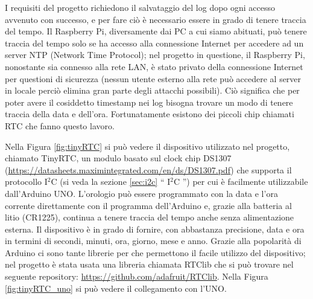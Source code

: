 \documentclass[12pt]{report}
\begin{document}
I requisiti del progetto richiedono il salvataggio del log dopo ogni accesso avvenuto con successo, e per fare ciò è necessario essere in grado di tenere traccia del tempo. Il Raspberry Pi, diversamente dai PC a cui siamo abituati, può tenere traccia del tempo solo se ha accesso alla connessione Internet per accedere ad un server NTP (Network Time Protocol); nel progetto in questione, il Raspberry Pi, nonostante sia connesso alla rete LAN, è stato privato della connessione Internet per questioni di sicurezza (nessun utente esterno alla rete può accedere al server in locale perciò elimina gran parte degli attacchi possibili). Ciò significa che per poter avere il cosiddetto timestamp nei log bisogna trovare un modo di tenere traccia della data e dell'ora. Fortunatamente esistono dei piccoli chip chiamati RTC che fanno questo lavoro. 

Nella Figura \ref{fig:tinyRTC} si può vedere il dispositivo utilizzato nel progetto, chiamato TinyRTC, un modulo basato sul clock chip DS1307 (\url{https://datasheets.maximintegrated.com/en/ds/DS1307.pdf}) che supporta il protocollo I$^2$C (si veda la sezione \ref{sec:i2c} \textquotedblleft{} I$^2$C \textquotedblright{}) per cui è facilmente utilizzabile dall'Arduino UNO.
L'orologio può essere programmato con la data e l'ora corrente direttamente con il programma dell'Arduino e, grazie alla batteria al litio (CR1225), continua a tenere traccia del tempo anche senza alimentazione esterna. Il dispositivo è in grado di fornire, con abbastanza precisione, data e ora in termini di secondi, minuti, ora, giorno, mese e anno. Grazie alla popolarità di Arduino ci sono tante librerie per che permettono il facile utilizzo del dispositivo; nel progetto è stata usata una libreria chiamata RTClib che si può trovare nel seguente repository: \url{https://github.com/adafruit/RTClib}. Nella Figura \ref{fig:tinyRTC_uno} si può vedere il collegamento con l'UNO.
\end{document}
